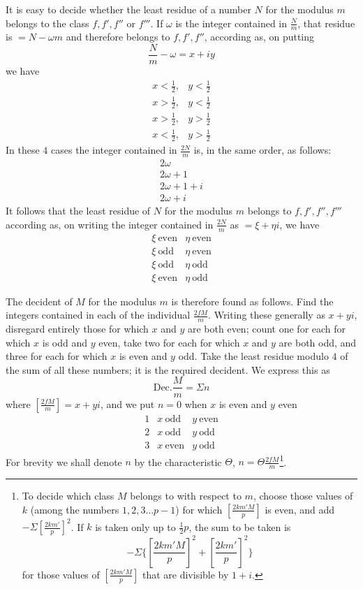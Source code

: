 It is easy to decide whether the least residue of a number $N$ for the modulus $m$ belongs to the class $f,f',f''$ or $f'''$. If $\omega$ is the integer contained in $\frac{N}{m}$, that residue is $=N-\omega m$ and therefore belongs to $f,f',f''$, according as, on putting
\[
\frac{N}{m}-\omega=x+iy
\]
we have
\[
\begin{array}{ll}
x<\tfrac12,&y<\tfrac12\\
x>\tfrac12,&y<\tfrac12\\
x>\tfrac12,&y>\tfrac12\\
x<\tfrac12,&y>\tfrac12
\end{array}
\]
In these $4$ cases the integer contained in $\frac{2N}{m}$ is, in the same order, as follows:
\[
\begin{array}{l}
2\omega\\
2\omega+1\\
2\omega+1+i\\
2\omega+i
\end{array}
\]
It follows that the least residue of $N$ for the modulus $m$ belongs to $f,f',f'',f'''$ according as, on writing the integer contained in $\frac{2N}{m}$ as $=\xi+\eta i$, we have
\[
\begin{array}{ll}
\xi\ \text{even}&\eta\ \text{even}\\
\xi\ \text{odd}&\eta\ \text{even}\\
\xi\ \text{odd}&\eta\ \text{odd}\\
\xi\ \text{even}&\eta\ \text{odd}
\end{array}
\]

The decident of $M$ for the modulus $m$ is therefore found as follows. Find the integers contained in each of the individual $\frac{2fM}{m}$. Writing these generally as $x+yi$, disregard entirely those for which $x$ and $y$ are both even; count one for each for which $x$ is odd and $y$ even, take two for each for which $x$ and $y$ are both odd, and three for each for which $x$ is even and $y$ odd. Take the least residue modulo $4$ of the sum of all these numbers; it is the required decident. We express this as
\[
\mathrm{Dec.}\frac{M}{m}=\Sigma n
\]
where $[\frac{2fM}{m}]=x+yi$, and we put $n=0$ when $x$ is even and $y$ even
\[
\begin{array}{cll}
1&x\ \text{odd}&y\ \text{even}\\
2&x\ \text{odd}&y\ \text{odd}\\
3&x\ \text{even}&y\ \text{odd}
\end{array}
\]
For brevity we shall denote $n$ by the characteristic $\Theta$, $n=\Theta\frac{2fM}{m}$\begingroup\renewcommand{\thefootnote}{*)}\footnote{To decide which class $M$ belongs to with respect to $m$, choose those values of $k$ (among the numbers $1,2,3\ldots p-1$) for which $[\frac{2km'M}{p}]$ is even, and add $-\Sigma[\frac{2km'}{p}]^2$. If $k$ is taken only up to $\frac12p$, the sum to be taken is
\[
-\Sigma\{[\frac{2km'M}{p}]^2+[\frac{2km'}{p}]^2\}
\]
for those values of $[\frac{2km'M}{p}]$ that are divisible by $1+i$.}\endgroup.
